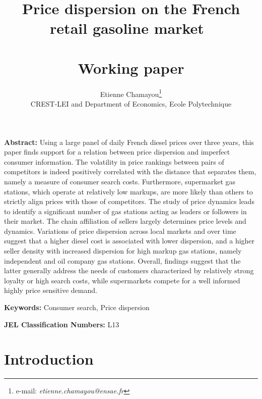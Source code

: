 \documentclass[english]{article}
\begin{document}
\title{Price dispersion on the French retail gasoline market\ \\ \ \\Working paper}
\author{Etienne Chamayou\thanks{e-mail:
\textit{etienne.chamayou@ensae.fr}}\medskip\\{\normalsize CREST-LEI and Department of Economics, Ecole Polytechnique }}
\maketitle

\sloppy%

\onehalfspacing

\textbf{Abstract:}
Using a large panel of daily French diesel prices over three years, this paper finds support for a relation between price dispersion and imperfect consumer information. The volatility in price rankings between pairs of competitors is indeed positively correlated with the distance that separates them, namely a measure of consumer search costs. Furthermore, supermarket gas stations, which operate at relatively low markups, are more likely than others to strictly align prices with those of competitors. The study of price dynamics leads to identify a significant number of gas stations acting as leaders or followers in their market. The chain affiliation of sellers largely determines price levels and dynamics. Variations of price dispersion across local markets and over time suggest that a higher diesel cost is associated with lower dispersion, and a higher seller density with increased dispersion for high markup gas stations, namely independent and oil company gas stations. Overall, findings suggest that the latter generally address the needs of customers characterized by relatively strong loyalty or high search costs, while supermarkets compete for a well informed highly price sensitive demand.

\strut

\textbf{Keywords:} Consumer search, Price dispersion

\strut

\textbf{JEL Classification Numbers:} L13

\pagebreak%

\section{Introduction}
\end{document}
